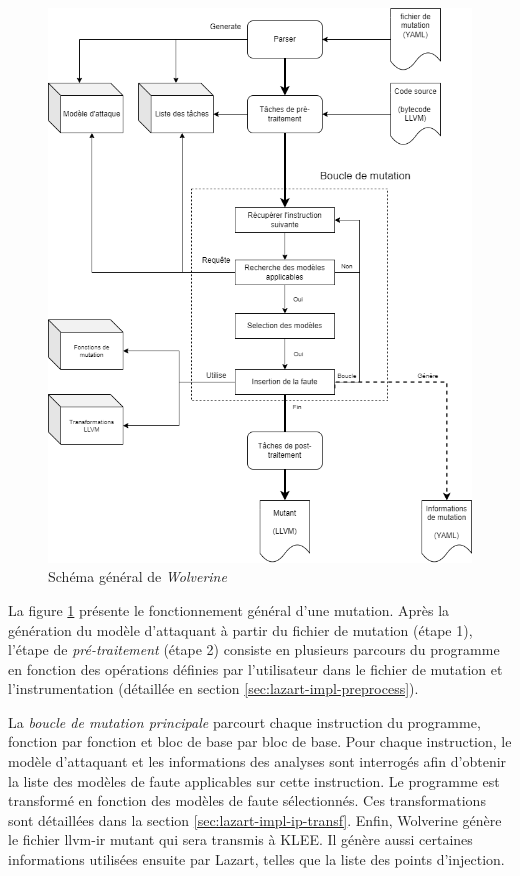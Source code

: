         \begin{figure}[ht]\centering
          \includegraphics[scale=.52]{ch3-lazart/img/wolverine4-fr.drawio.png}
          \caption{Schéma général de \textit{Wolverine}  \label{fig:wolverine}}
        \end{figure}
        
        La figure \ref{fig:wolverine} présente le fonctionnement général d'une mutation.  
        Après la génération du modèle d'attaquant à partir du fichier de mutation (étape 1), l'étape de \textit{pré-traitement} (étape 2) consiste en plusieurs parcours du programme en fonction des opérations définies par l'utilisateur dans le fichier de mutation et l'instrumentation (détaillée en section \ref{sec:lazart-impl-preprocess}). 
        
        La \textit{boucle de mutation principale} parcourt chaque instruction du programme, fonction par fonction et bloc de base par bloc de base. Pour chaque instruction, le modèle d'attaquant et les informations des analyses sont interrogés afin d'obtenir la liste des modèles de faute applicables sur cette instruction. Le programme est transformé en fonction des modèles de faute sélectionnés. Ces transformations sont détaillées dans la section \ref{sec:lazart-impl-ip-transf}.
        Enfin, Wolverine génère le fichier \gls{llvm-ir} mutant qui sera transmis à KLEE. Il génère aussi certaines informations utilisées ensuite par Lazart, telles que la liste des points d'injection.
        
